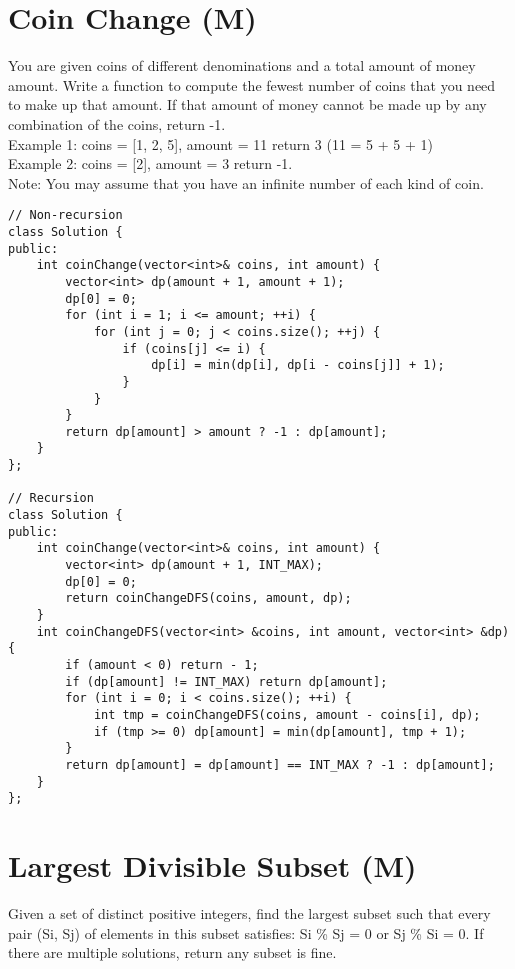 \section{Coin Change (M)}
You are given coins of different denominations and a total amount of money amount. Write a function to compute the fewest number of coins that you need to make up that amount. If that amount of money cannot be made up by any combination of the coins, return -1.\\

Example 1:
coins = [1, 2, 5], amount = 11
return 3 (11 = 5 + 5 + 1)\\

Example 2:
coins = [2], amount = 3
return -1.\\

Note:
You may assume that you have an infinite number of each kind of coin. \\

\begin{lstlisting}
// Non-recursion
class Solution {
public:
    int coinChange(vector<int>& coins, int amount) {
        vector<int> dp(amount + 1, amount + 1);
        dp[0] = 0;
        for (int i = 1; i <= amount; ++i) {
            for (int j = 0; j < coins.size(); ++j) {
                if (coins[j] <= i) {
                    dp[i] = min(dp[i], dp[i - coins[j]] + 1);
                }
            }
        }
        return dp[amount] > amount ? -1 : dp[amount];
    }
};

// Recursion
class Solution {
public:
    int coinChange(vector<int>& coins, int amount) {
        vector<int> dp(amount + 1, INT_MAX);
        dp[0] = 0;
        return coinChangeDFS(coins, amount, dp);
    }
    int coinChangeDFS(vector<int> &coins, int amount, vector<int> &dp) {
        if (amount < 0) return - 1;
        if (dp[amount] != INT_MAX) return dp[amount];
        for (int i = 0; i < coins.size(); ++i) {
            int tmp = coinChangeDFS(coins, amount - coins[i], dp);
            if (tmp >= 0) dp[amount] = min(dp[amount], tmp + 1);
        }
        return dp[amount] = dp[amount] == INT_MAX ? -1 : dp[amount];
    }
};
\end{lstlisting}


\section{Largest Divisible Subset (M)}
Given a set of distinct positive integers, find the largest subset such that every pair (Si, Sj) of elements in this subset satisfies: Si \% Sj = 0 or Sj \% Si = 0. If there are multiple solutions, return any subset is fine.\\

